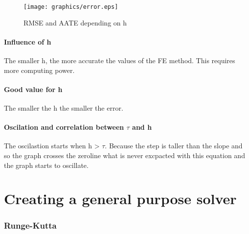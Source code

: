			
			\begin{figure}[H]
				\centering
				\texttt{[image: graphics/error.eps]}
				\caption{RMSE and AATE depending on h}
				\label{fig:err}
			\end{figure}
			
%				
%				
			
			

		
		\subsection{Influence of h}
		The smaller h, the more accurate the values of the FE method. This requires more computing power.
		
		\subsection{Good value for h}
		The smaller the h the smaller the error.
		
		\subsection{Oscilation and correlation between $\tau$ and h}
		The oscilastion starts when h > $\tau$. Because the step is taller than the slope and so the graph crosses the zeroline what is never excpacted with this equation and the graph starts to oscillate.

		
					

\part{Creating a general purpose solver}

	\section{Runge-Kutta}
